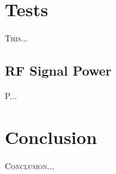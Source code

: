 \documentclass[12pt]{book}
\begin{document}
\chapter{Tests}

\lettrine{T}{his}...

\section{RF Signal Power}

P...


\chapter{Conclusion} \label{ch:conclusion}

\lettrine{C}{onclusion}...




\end{document}
